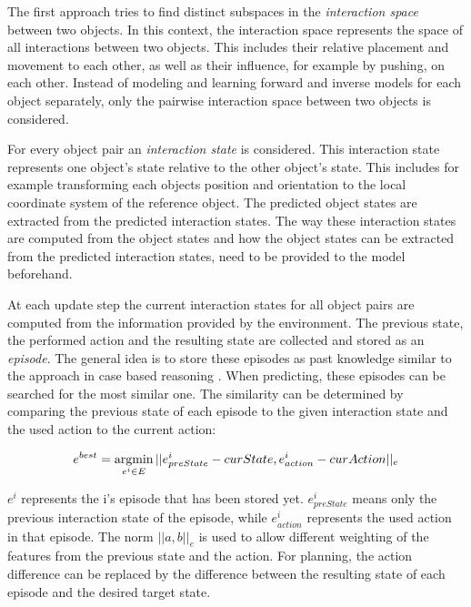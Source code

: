 The first approach tries to find distinct subspaces in the \textit{interaction space} between two objects. In this context, the interaction space represents the space of all interactions between two objects. This includes their relative placement and movement to each other, as well as their influence, for example by pushing, on each other. Instead of modeling and learning forward and inverse models for each object separately, only the pairwise interaction space between two objects is considered.  

For every object pair an \textit{interaction state} is considered. This interaction state represents one object's state relative to the other object's state. This includes for example transforming each objects position and orientation to the local coordinate system of the reference object. %
The predicted object states are extracted from the predicted interaction states. The way these interaction states are computed from the object states and how the object states can be extracted from the predicted interaction states, need to be provided to the model beforehand. %

At each update step the current interaction states for all object pairs are computed from the information provided by the environment. The previous state, the performed action and the resulting state are collected and stored as an \textit{episode}. The general idea is to store these episodes as past knowledge similar to the approach in case based reasoning \cite{cbr}. When predicting, these episodes can be searched for the most similar one. The similarity can be determined by comparing the previous state of each episode to the given interaction state and the used action to the current action:

\begin{equation}
e^{best} = \argmin_{e^i \in E} ||e^i_{preState}-curState, e^i_{action}-curAction||_e
\label{eq:bestEpisode}
\end{equation}


$e^i$ represents the i's episode that has been stored yet. $e^i_{preState}$ means only the previous interaction state of the episode, while $e^i_{action}$ represents the used action in that episode.
The norm $||a,b||_e$ is used to allow different weighting of the features from the previous state and the action. For planning, the action difference can be replaced by the difference between the resulting state of each episode and the desired target state.

